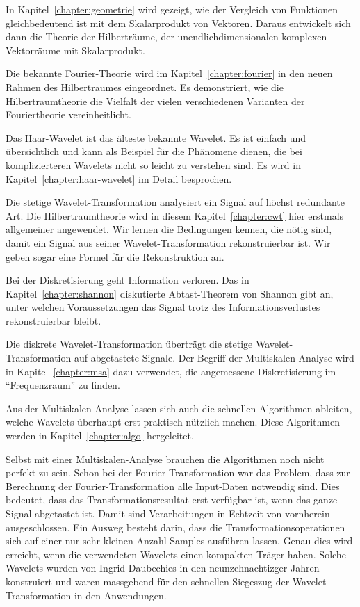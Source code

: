 In Kapitel~\ref{chapter:geometrie} wird gezeigt, wie der Vergleich
von Funktionen gleichbedeutend ist mit dem Skalarprodukt von Vektoren.
Daraus entwickelt sich dann die Theorie der Hilberträume, der
unendlichdimensionalen komplexen Vektorräume mit Skalarprodukt.

Die bekannte Fourier-Theorie wird im Kapitel~\ref{chapter:fourier} in
den neuen Rahmen des Hilbertraumes eingeordnet.
Es demonstriert, wie die Hilbertraumtheorie die Vielfalt der vielen
verschiedenen Varianten der Fouriertheorie vereinheitlicht.

Das Haar-Wavelet ist das älteste bekannte Wavelet.
Es ist einfach und übersichtlich und kann als Beispiel für die
Phänomene dienen, die bei komplizierteren Wavelets nicht so leicht
zu verstehen sind.
Es wird in Kapitel~\ref{chapter:haar-wavelet} im Detail besprochen.

Die stetige Wavelet-Transformation analysiert ein Signal auf höchst
redundante Art.
Die Hilbert\-raum\-theorie wird in diesem Kapitel~\ref{chapter:cwt} hier
erstmals allgemeiner angewendet.
Wir lernen die Be\-ding\-ungen kennen, die nötig sind, damit ein Signal
aus seiner Wavelet-Transformation rekonstruierbar ist.
Wir geben sogar eine Formel für die Rekonstruktion an.

Bei der Diskretisierung geht Information verloren.
Das in Kapitel~\ref{chapter:shannon} diskutierte Abtast-Theorem
von Shannon gibt an, unter welchen Voraussetzungen das Signal trotz
des Informationsverlustes rekonstruierbar bleibt.

Die diskrete Wavelet-Transformation überträgt die stetige
Wavelet-Transformation auf abgetastete Signale.
Der Begriff der Multiskalen-Analyse wird in Kapitel~\ref{chapter:msa}
dazu verwendet, die angemessene Diskretisierung im ``Frequenzraum''
zu finden.

Aus der Multiskalen-Analyse lassen sich auch die schnellen Algorithmen
ableiten, welche Wavelets überhaupt erst praktisch nützlich machen.
Diese Algorithmen werden in Kapitel~\ref{chapter:algo} hergeleitet.

Selbst mit einer Multiskalen-Analyse brauchen die Algorithmen noch nicht
perfekt zu sein.
Schon bei der Fourier-Transformation war das Problem, dass zur Berechnung
der Fourier-Trans\-for\-ma\-tion alle Input-Daten notwendig sind.
Dies bedeutet, dass das Transformationsresultat erst verfügbar ist,
wenn das ganze Signal abgetastet ist.
Damit sind Verarbeitungen in Echtzeit von vornherein ausgeschlossen.
Ein Ausweg besteht darin, dass die Transformationsoperationen sich auf
einer nur sehr kleinen Anzahl Samples ausführen lassen.
Genau dies wird erreicht, wenn die verwendeten Wavelets einen kompakten Träger
haben.
Solche Wavelets wurden von Ingrid Daubechies in den neunzehnachtizger
Jahren konstruiert und waren massgebend für den schnellen Siegeszug 
der Wavelet-Transformation in den Anwendungen.

